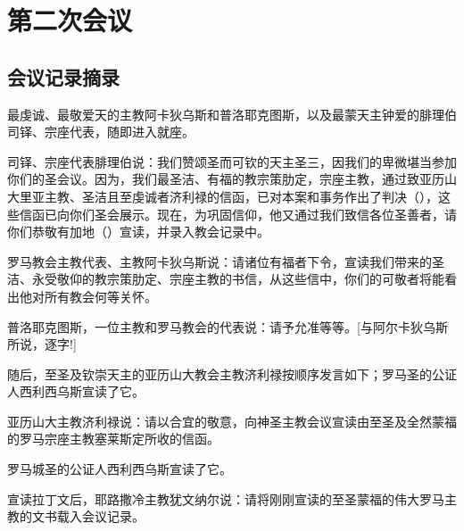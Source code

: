 
\section{第二次会议}


\subsection{会议记录摘录}

最虔诚、最敬爱天的主教阿卡狄乌斯和普洛耶克图斯，以及最蒙天主钟爱的腓理伯司铎、宗座代表，随即进入就座。\par

司铎、宗座代表腓理伯说：我们赞颂圣而可钦的天主圣三，因我们的卑微堪当参加你们的圣会议。因为，我们最圣洁、有福的教宗策肋定，宗座主教，通过致亚历山大里亚主教、圣洁且至虔诚者济利禄的信函，已对本案和事务作出了判决（），这些信函已向你们圣会展示。现在，为巩固信仰，他又通过我们致信各位圣善者，请你们恭敬有加地（）宣读，并录入教会记录中。\par

罗马教会主教代表、主教阿卡狄乌斯说：请诸位有福者下令，宣读我们带来的圣洁、永受敬仰的教宗策肋定、宗座主教的书信，从这些信中，你们的可敬者将能看出他对所有教会何等关怀。\par

普洛耶克图斯，一位主教和罗马教会的代表说：请予允准等等。[与阿尔卡狄乌斯所说，逐字!]\par

随后，至圣及钦崇天主的亚历山大教会主教济利禄按顺序发言如下；罗马圣的公证人西利西乌斯宣读了它。\par

亚历山大主教济利禄说：请以合宜的敬意，向神圣主教会议宣读由至圣及全然蒙福的罗马宗座主教塞莱斯定所收的信函。\par

罗马城圣的公证人西利西乌斯宣读了它。\par

宣读拉丁文后，耶路撒冷主教犹文纳尔说：请将刚刚宣读的至圣蒙福的伟大罗马主教的文书载入会议记录。\par

